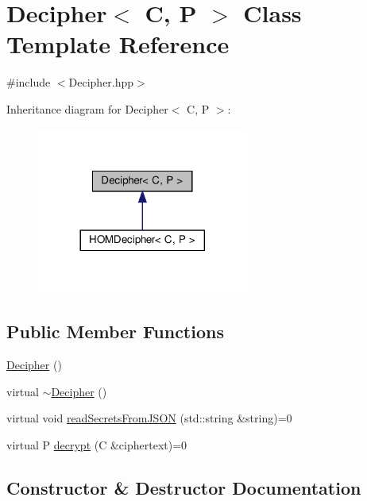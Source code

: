 \hypertarget{classDecipher}{}\section{Decipher$<$ C, P $>$ Class Template Reference}
\label{classDecipher}


{\ttfamily \#include $<$Decipher.\+hpp$>$}



Inheritance diagram for Decipher$<$ C, P $>$\+:
\nopagebreak
\begin{figure}[H]
\begin{center}
\leavevmode
\includegraphics[width=197pt]{classDecipher__inherit__graph}
\end{center}
\end{figure}
\subsection*{Public Member Functions}
\begin{DoxyCompactItemize}
\item 
\hyperlink{classDecipher_a08c3ce832e3884da97f36fcfac6f70db}{Decipher} ()
\item 
virtual \hyperlink{classDecipher_af1489f4e86a28217bdee9cf16d983faf}{$\sim$\+Decipher} ()
\item 
virtual void \hyperlink{classDecipher_a39aea002012130201e12a8fa7d84dda5}{read\+Secrets\+From\+J\+S\+ON} (std\+::string \&string)=0
\item 
virtual P \hyperlink{classDecipher_ac6b8c369eda2d7e17fa90cb594cf41b6}{decrypt} (C \&ciphertext)=0
\end{DoxyCompactItemize}


\subsection{Constructor \& Destructor Documentation}
\mbox{\label{classDecipher_a08c3ce832e3884da97f36fcfac6f70db}} 
